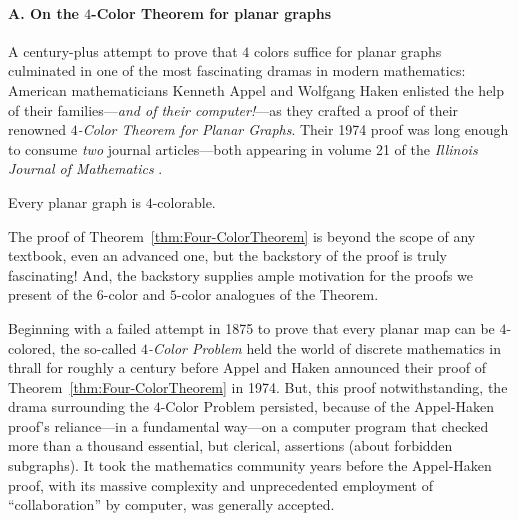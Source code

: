   

\paragraph{A. On the $4$-Color Theorem for planar graphs}

A century-plus attempt to prove that $4$ colors suffice for planar graphs culminated in one of the most fascinating dramas in modern mathematics:  American mathematicians Kenneth Appel and Wolfgang Haken enlisted the help of their families---{\em and of their computer!}---as they crafted a proof of their renowned {\it $4$-Color Theorem for Planar Graphs}.  Their 1974 proof was long enough to consume {\em two} journal articles---both appearing in volume 21 of the {\it Illinois Journal of Mathematics} \cite{AppelH77a,AppelH77b}.


\begin{theorem}
\label{thm:Four-ColorTheorem}
Every planar graph is $4$-colorable.
\end{theorem}


The proof of Theorem~\ref{thm:Four-ColorTheorem} is beyond the scope of any textbook, even an advanced one, but the backstory of the proof is truly fascinating!  And, the backstory supplies ample motivation for the proofs we present of the $6$-color and $5$-color analogues of the Theorem.

\medskip

Beginning with a failed attempt in 1875 to prove that every planar map can be $4$-colored, the so-called {\it $4$-Color Problem} held the world of discrete  mathematics in thrall for roughly a century before Appel and Haken announced their proof of Theorem~\ref{thm:Four-ColorTheorem} in 1974.  But, this proof notwithstanding, the drama surrounding the $4$-Color Problem persisted, because of the Appel-Haken proof's reliance---in a fundamental way---on a computer program that checked more than a thousand essential, but clerical, assertions (about forbidden subgraphs).  It took the
mathematics community years before the Appel-Haken proof, with its massive complexity and unprecedented employment of ``collaboration'' by computer, was generally accepted.


